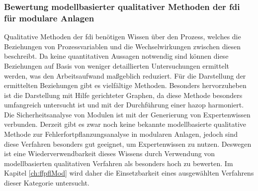 \subsubsection{Bewertung modellbasierter qualitativer Methoden der \ac{fdi} f\"ur modulare Anlagen}
Qualitative Methoden der \ac{fdi} ben\"otigen Wissen \"uber den Prozess, welches die Beziehungen von Prozessvariablen und die Wechselwirkungen zwischen diesen beschreibt. Da keine quantitativen Aussagen notwendig sind k\"onnen diese Beziehungen auf Basis von weniger detaillierten Untersuchungen ermittelt werden, was den Arbeitsaufwand ma\ss{}geblich reduziert.  F\"ur die Darstellung der ermittelten Beziehungen gibt es vielf\"altige Methoden. Besonders hervorzuheben ist die Darstellung mit Hilfe gerichteter Graphen, da diese Methode besonders umfangreich untersucht ist und mit der Durchf\"uhrung einer \ac{hazop} harmoniert. \newline
Die Sicherheitsanalyse von Modulen ist mit der Generierung von Expertenwissen verbunden. Derzeit gibt es zwar noch keine bekannte modellbasierte qualitative Methode zur Fehlerfortpflanzungsanalyse in modularen Anlagen, jedoch sind diese Verfahren besonders gut geeignet, um Expertenwissen zu nutzen. Deswegen ist eine Wiederverwendbarkeit dieses Wissens durch Verwendung von modellbasierten qualitativen Verfahren als besonders hoch zu bewerten. Im Kapitel \ref{ch:ffpflMod} wird daher die Einsetzbarkeit eines ausgew\"ahlten Verfahrens dieser Kategorie untersucht. 

